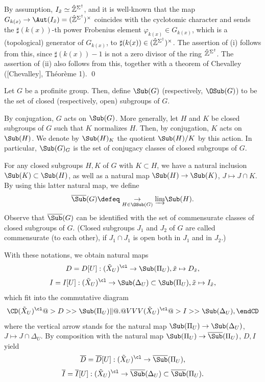 By assumption, $I_{\tilde x}\simeq {\hat {\Bbb Z}}^{\Sigma^{\dag}}$, and it is 
well-known that the map $G_{k(x)}\to \Aut(I_{\tilde x})
=({\hat {\Bbb Z}}^{\Sigma^{\dag}})^{\times}$ coincides with the cyclotomic 
character and sends the $\sharp(k(x))$-th power 
Frobenius element $\varphi_{k(x)}\in G_{k(x)}$, which is a (topological) generator 
of $G_{k(x)}$, to $\sharp(k(x))\in ({\hat {\Bbb Z}}^{\Sigma^{\dag}})^{\times}$. 
The assertion of (i) follows from this, since $\sharp(k(x))-1$ 
is not a zero divisor of the ring ${\hat {\Bbb Z}}^{\Sigma^{\dag}}$. The assertion 
of (ii) also follows from this, together with a theorem of Chevalley 
([Chevalley], Th\'eor\`eme 1). 
\qed
\enddemo

Let $G$ be a profinite group. Then, define $\Sub(G)$ 
(respectively, $\OSub(G)$) 
to be the set of closed (respectively, open) subgroups of $G$. 

By conjugation, $G$ acts on $\Sub(G)$. More generally, 
let $H$ and $K$ be closed subgroups of $G$ such that 
$K$ normalizes $H$. Then, by conjugation, $K$ acts on 
$\Sub(H)$. We denote by $\Sub(H)_K$ the quotient 
$\Sub(H)/K$ by this action. In particular, 
$\Sub(G)_G$ is the set of conjugacy classes of 
closed subgroups of $G$. 

For any closed subgroups $H,K$ of $G$ with $K\subset H$, 
we have 
a natural inclusion 
$\Sub(K)\subset \Sub(H)$, as well as 
a natural map
$\Sub(H)\to\Sub(K)$, $J\mapsto J\cap K$. By using this latter 
natural map, we define
$$\overline{\Sub}(G)\defeq\underset{H\in\OSub(G)}\to{\varinjlim}
\Sub(H).$$
Observe that $\overline{\Sub}(G)$ can be identified with 
the set of commensurate classes of closed subgroups of $G$. 
(Closed subgroups $J_1$ and $J_2$ of $G$ are called commensurate 
(to each other), if $J_1\cap J_1$ is open both in $J_1$ and in $J_2$.) 

With these notations, we obtain natural maps
$$D=D[U]:({\tilde X}_U)^{\cl}\to\Sub(\Pi_U), {\tilde x}\mapsto D_{\tilde x},$$
$$I=I[U]:({\tilde X}_U)^{\cl}\to\Sub(\Delta_U)\subset
\Sub(\Pi_U), {\tilde x}\mapsto I_{\tilde x},$$
which fit into the commutative diagram
$$\CD
({\tilde X}_U)^{\cl} @>{D}>> \Sub(\Pi_U) \\
\| @. @VVV \\
({\tilde X}_U)^{\cl} @>{I}>> \Sub(\Delta_U), 
\endCD
$$
where the vertical arrow stands for the natural map 
$\Sub(\Pi_U)\to \Sub(\Delta_U)$, 
$J\mapsto J\cap \Delta_U$. 
By composition with the natural map 
$\Sub(\Pi_U)\to\overline{\Sub}(\Pi_U)$, $D,I$ yield 
$$\overline{D}=\overline{D}[U]:({\tilde X}_U)^{\cl}\to\overline{\Sub}(\Pi_U),$$
$$\overline{I}=\overline{I}[U]:({\tilde X}_U)^{\cl}\to\overline{\Sub}
(\Delta_U)\subset \overline{\Sub}(\Pi_U).$$

